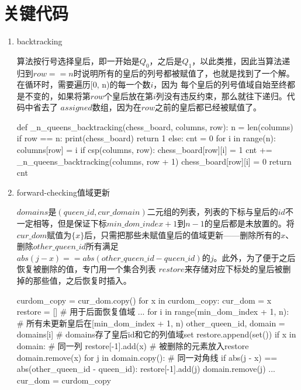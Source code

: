 \documentclass[10pt,letterpaper]{ctexart}
\begin{document}
\newpage
\section{关键代码}
\begin{enumerate}[itemindent=2em,label=\arabic*、]
\item backtracking
\par \qquad 算法按行号选择皇后，即一开始是$Q_0$，之后是$Q_1$，以此类推，因此当算法递归到$row == n$时说明所有的皇后的列号都被赋值了，也就是找到了一个解。在循环时，需要遍历[0, n)的每一个数$i$，因为
每个皇后的列号值域自始至终都是不变的，如果将第$row$个皇后放在第$i$列没有违反约束，那么就往下递归。代码中省去了
$assigned$数组，因为在$row$之前的皇后都已经被赋值了。
\begin{python}
def _n_queens_backtracking(chess_board, columns, row):
    n = len(columns)
    if row == n:
        print(chess_board)
        return 1
    else:
        cnt = 0
        for i in range(n):
            columns[row] = i
            if csp(columns, row):
                chess_board[row][i] = 1
                cnt += _n_queens_backtracking(columns, row + 1)
                chess_board[row][i] = 0
        return cnt
\end{python}

\item forward-checking值域更新
\par \qquad $domains$是$(queen\_id,cur\_domain)$二元组的列表，列表的下标与皇后的$id$不一定相等，但是保证下标$min\_dom\_index+1$到$n-1$的皇后都是未放置的。将$cur\_dom$赋值为$\{x\}$后，只需把那些未赋值皇后的值域更新——删除所有的$x$、删除$other\_queen\_id$所有满足$abs(j - x) == abs(other\_queen\_id - queen\_id)$的$j$。此外，为了便于之后恢复被删除的值，专门用一个集合列表
$restore$来存储对应下标处的皇后被删掉的那些值，之后恢复时插入。
\begin{python}
curdom_copy = cur_dom.copy()
for x in curdom_copy:
    cur_dom = {x}
    restore = []     # 用于后面恢复值域
    ...
    for i in range(min_dom_index + 1, n):   # 所有未更新皇后在[min_dom_index + 1, n)
        other_queen_id, domain = domains[i]   # domains存了皇后id和它的列值域set
        restore.append(set())
        if x in domain:     # 同一列
            restore[-1].add(x)    # 被删除的元素放入restore
            domain.remove(x)
        for j in domain.copy():   # 同一对角线
            if abs(j - x) == abs(other_queen_id - queen_id):
                restore[-1].add(j)
                domain.remove(j)
        ...
cur_dom = curdom_copy
\end{python}


\end{enumerate}
\end{document}
